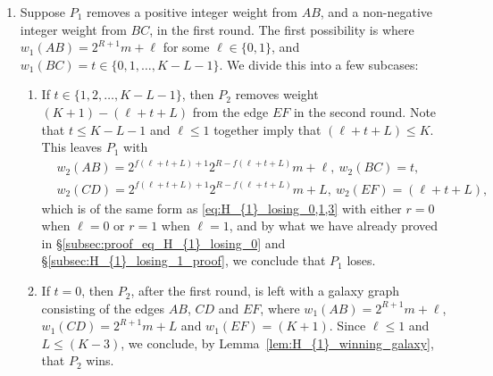 \documentclass[11pt,reqno]{amsart}
\theoremstyle{definition}
\theoremstyle{definition}
\begin{document}
\begin{enumerate}
\begin{enumerate}
\item If $\ell\in\{0,1,\ldots,L-1\}$ and $t=0$, $P_{2}$, after the first round, is left with a galaxy graph consisting of the edges $AB$, $CD$ and $EF$, where $w_{1}(AB)=2^{R+1}m+2$, $w_{1}(CD)=2^{R+1}m+\ell$ and $w_{1}(EF)=(K+1)$. Since $\ell\leqslant(L-1)$ and $L\leqslant (K-3)$, we conclude, by Lemma~\ref{lem:H_{1}_winning_galaxy}, that $P_{2}$ wins.
\end{enumerate}

The second possibility is that $w_{1}(CD)=2^{R+1}n+\ell_{1}$ for some $n < m$ and some $\ell_{1}\in\{0,1,\ldots,2^{R+1}-1\}$. In this case, the configuration after the first round is of the same form as in Lemma~\ref{prop:H_{1}_winning_1}, with $m_{1}=n$, $m_{2}=m$ and $\ell_{2}=2$, and as $n < m \implies m_{1}\neq m_{2}$, we know that $P_{2}$ wins by Lemma~\ref{prop:H_{1}_winning_1}.

\item Suppose $P_{1}$ removes a positive integer weight from $AB$, and a non-negative integer weight from $BC$, in the first round. The first possibility is where $w_{1}(AB)=2^{R+1}m+\ell$ for some $\ell \in \{0,1\}$, and $w_{1}(BC)=t\in\{0,1,\ldots,K-L-1\}$. We divide this into a few subcases:
\begin{enumerate}
\item If $t\in \{1,2,\ldots,K-L-1\}$, then $P_{2}$ removes weight $(K+1)-(\ell+t+L)$ from the edge $EF$ in the second round. Note that $t \leqslant K-L-1$ and $\ell \leqslant 1$ together imply that $(\ell+t+L) \leqslant K$. This leaves $P_{1}$ with
\begin{align}
{}&w_{2}(AB)=2^{f(\ell+t+L)+1}2^{R-f(\ell+t+L)}m+\ell,\ w_{2}(BC)=t,\nonumber\\
{}&w_{2}(CD)=2^{f(\ell+t+L)+1}2^{R-f(\ell+t+L)}m+L,\ w_{2}(EF)=(\ell+t+L),\nonumber
\end{align}
which is of the same form as \eqref{eq:H_{1}_losing_0,1,3} with either $r=0$ when $\ell=0$ or $r=1$ when $\ell=1$, and by what we have already proved in \S\ref{subsec:proof_eq_H_{1}_losing_0} and \S\ref{subsec:H_{1}_losing_1_proof}, we conclude that $P_{1}$ loses.

\item If $t=0$, then $P_{2}$, after the first round, is left with a galaxy graph consisting of the edges $AB$, $CD$ and $EF$, where $w_{1}(AB)=2^{R+1}m+\ell$, $w_{1}(CD)=2^{R+1}m+L$ and $w_{1}(EF)=(K+1)$. Since $\ell\leqslant 1$ and $L\leqslant(K-3)$, we conclude, by Lemma~\ref{lem:H_{1}_winning_galaxy}, that $P_{2}$ wins.
\end{enumerate}


\end{enumerate}
\end{document}
